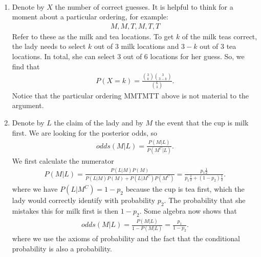 
\setcounter{theorem}{30}
\begin{exercise}[BH.3.31]
\begin{solution}~
    \begin{enumerate}
        \item Denote by $X$ the number of correct guesses. It is helpful to think for a moment about a particular ordering, for example:
        \begin{align*}
            M,M,T,M,T,T
        \end{align*}
        Refer to these as the milk and tea locations. To get $k$ of the milk teas correct, the lady needs to select $k$ out of 3 milk locations and $3-k$ out of 3 tea locations. In total, she can select 3 out of 6 locations for her guess. So, we find that
        \begin{align*}
            P(X=k) = \frac{{3 \choose k}{3 \choose 3-k}}{{6 \choose 3}}.
        \end{align*}
        Notice that the particular ordering MMTMTT above is not material to the argument.
        \item  Denote by $L$ the claim of the lady and by $M$ the event that the cup is milk first. We are looking for the posterior odds, so
        \begin{align*}
            odds(M|L) = \frac{P(M|L)}{P(M^{C}|L)}.
        \end{align*}
        We first calculate the numerator
        \begin{align*}
            P(M|L) = \frac{P(L|M)P(M)}{P(L|M)P(M) + P(L|M^{C})P(M^{C})} = \frac{p_{1}\frac{1}{2}}{p_1\frac{1}{2} + (1-p_{2})\frac{1}{2}}.
        \end{align*}
        where we have $ P(L|M^{C})=1-p_{2}$ because the cup is tea first, which the lady would correctly identify with probability $p_{2}$. The probability that she mistakes this for milk first is then $1-p_{2}$. Some algebra now shows that
                        \begin{align*}
        odds(M|L) = \frac{P(M|L)}{1-P(M|L)} =\frac{p_{1}}{1-p_{2}}.
        \end{align*}
        where we use the axioms of probability and the fact that the conditional probability is also a probability.
    \end{enumerate}
\end{solution}
\end{exercise}


